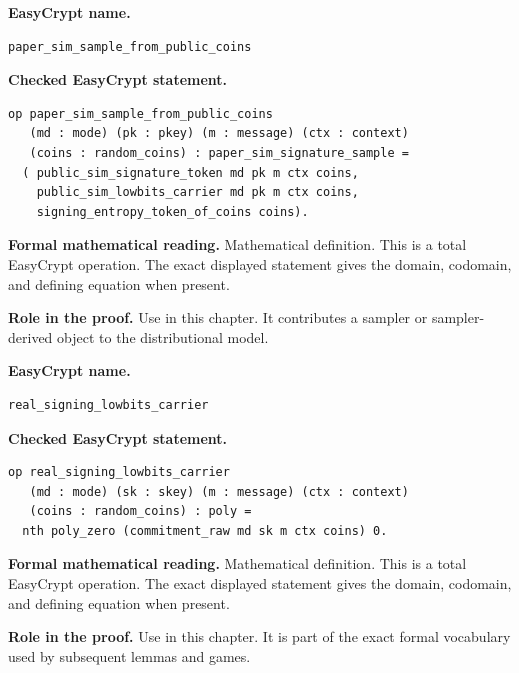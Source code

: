 \begin{formaldefinition}
\noindent\textbf{EasyCrypt name.}
\begin{lstlisting}[language=EasyCrypt,basicstyle=\ttfamily\scriptsize]
paper_sim_sample_from_public_coins
\end{lstlisting}
\noindent\textbf{Checked EasyCrypt statement.}
\begin{lstlisting}[language=EasyCrypt,basicstyle=\ttfamily\scriptsize]
op paper_sim_sample_from_public_coins
   (md : mode) (pk : pkey) (m : message) (ctx : context)
   (coins : random_coins) : paper_sim_signature_sample =
  ( public_sim_signature_token md pk m ctx coins,
    public_sim_lowbits_carrier md pk m ctx coins,
    signing_entropy_token_of_coins coins).
\end{lstlisting}
\noindent\textbf{Formal mathematical reading.}
Mathematical definition. This is a total EasyCrypt operation.  The exact displayed statement gives the domain, codomain, and defining equation when present.

\noindent\textbf{Role in the proof.}
Use in this chapter. It contributes a sampler or sampler-derived object to the distributional model.

\end{formaldefinition}

\begin{formaldefinition}
\noindent\textbf{EasyCrypt name.}
\begin{lstlisting}[language=EasyCrypt,basicstyle=\ttfamily\scriptsize]
real_signing_lowbits_carrier
\end{lstlisting}
\noindent\textbf{Checked EasyCrypt statement.}
\begin{lstlisting}[language=EasyCrypt,basicstyle=\ttfamily\scriptsize]
op real_signing_lowbits_carrier
   (md : mode) (sk : skey) (m : message) (ctx : context)
   (coins : random_coins) : poly =
  nth poly_zero (commitment_raw md sk m ctx coins) 0.
\end{lstlisting}
\noindent\textbf{Formal mathematical reading.}
Mathematical definition. This is a total EasyCrypt operation.  The exact displayed statement gives the domain, codomain, and defining equation when present.

\noindent\textbf{Role in the proof.}
Use in this chapter. It is part of the exact formal vocabulary used by subsequent lemmas and games.

\end{formaldefinition}


